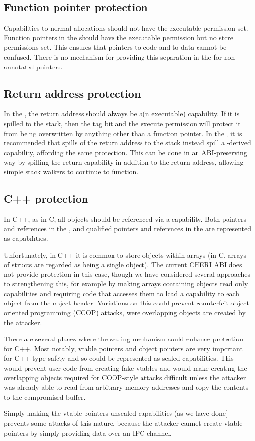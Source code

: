\subsection{Function pointer protection}

Capabilities to normal allocations should not have the executable permission set.
Function pointers in the \sandboxABI{} should have the executable permission but no store permissions set.
This ensures that pointers to code and to data cannot be confused.
There is no mechanism for providing this separation in the \hybridABI{} for non-annotated pointers.

\subsection{Return address protection}

In the \sandboxABI{}, the return address should always be a(n executable) capability.
If it is spilled to the stack, then the tag bit and the execute permission will protect it from being overwritten by anything other than a function pointer.
In the \hybridABI{}, it is recommended that spills of the return address to the stack instead spill a -derived capability, affording the same protection.
This can be done in an ABI-preserving way by spilling the return capability in addition to the return address, allowing simple stack walkers to continue to function.

\subsection{C++ protection}

In C++, as in C, all objects should be referenced via a capability.
Both pointers and references in the \sandboxABI{}, and qualified pointers and references in the \hybridABI{} are represented as capabilities.

Unfortunately, in C++ it is common to store objects within arrays (in C, arrays of structs are regarded as being a single object).
The current CHERI ABI does not provide protection in this case, though we have considered several approaches to strengthening this, for example by making arrays containing objects read only capabilities and requiring code that accesses them to load a capability to each object from the object header.
Variations on this could prevent counterfeit object oriented programming (COOP) attacks, were overlapping objects are created by the attacker.

There are several places where the sealing mechanism could enhance protection for C++.
Most notably, vtable pointers and  object pointers are very important for C++ type safety and so could be represented as sealed capabilities.
This would prevent user code from creating fake vtables and would make creating the overlapping objects required for COOP-style attacks difficult unless the attacker was already able to read from arbitrary memory addresses and copy the contents to the compromised buffer.

Simply making the vtable pointers unsealed capabilities (as we have done) prevents some attacks of this nature, because the attacker cannot create vtable pointers by simply providing data over an IPC channel.

